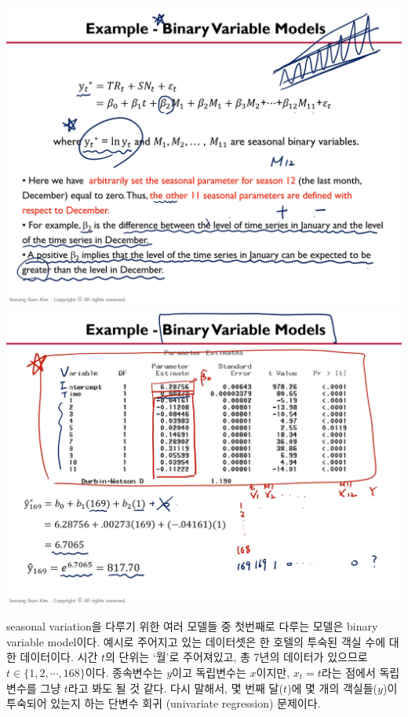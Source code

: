 \documentclass{article}
\begin{document}
\begin{center}
\includegraphics[width=.45\textwidth]{model_1-6}
\includegraphics[width=.45\textwidth]{model_1-7}
\end{center}

seasonal variation을 다루기 위한 여러 모델들 중 첫번째로 다루는 모델은 binary variable model이다.
예시로 주어지고 있는 데이터셋은 한 호텔의 투숙된 객실 수에 대한 데이터이다.
시간 \(t\)의 단위는 `월'로 주어져있고, 총 7년의 데이터가 있으므로 \(t\in\{1, 2,\cdots,168\}\)이다.
종속변수는 \(y\)이고 독립변수는 \(x\)이지만, \(x_t=t\)라는 점에서 독립변수를 그냥 \(t\)라고 봐도 될 것 같다.
다시 말해서, 몇 번째 달(\(t\))에 몇 개의 객실들(\(y\))이 투숙되어 있는지 하는 단변수 회귀 (univariate regression) 문제이다.
\end{document}
